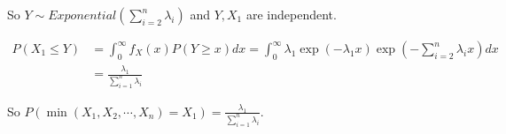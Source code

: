 \documentclass{article}
\begin{document}
So $Y\sim Exponential(\sum_{i=2}^n\lambda_i)$ and $Y,X_1$ are independent.

\begin{equation}
    \begin{aligned}
        P(X_1\leqslant Y) & = \int_{0}^{\infty}f_X(x) P(Y\geqslant x) dx =  \int_{0}^{\infty}\lambda_1 \exp(-\lambda_1 x) \exp(-\sum_{i=2}^n\lambda_i x)  dx \\
        & = \frac{\lambda_1}{ \sum_{i=1}^n\lambda_i}
    \end{aligned}
\end{equation}

So $P(\min(X_1,X_2,\cdots,X_n)= X_1) = \frac{\lambda_1}{ \sum_{i=1}^n\lambda_i}$.
\end{document}
